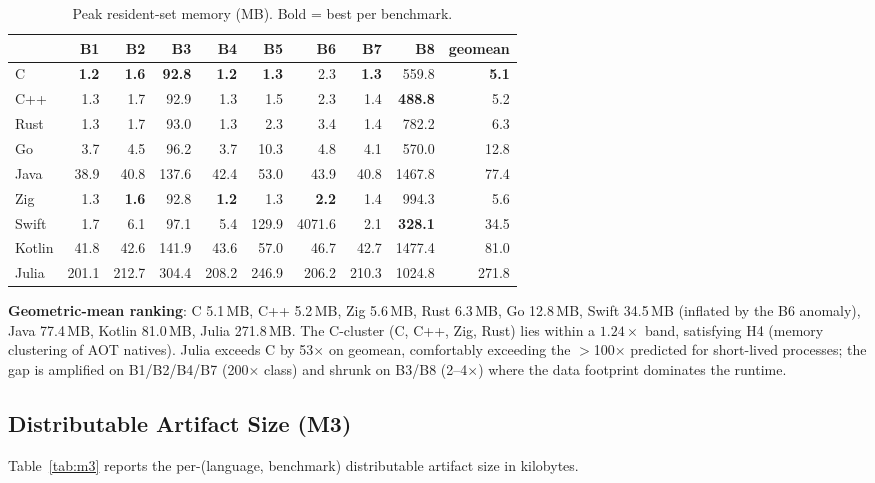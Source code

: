 \documentclass[10pt,conference]{IEEEtran}
\begin{document}
\begin{table}[t]
\caption{Peak resident-set memory (MB). Bold = best per benchmark.}
\label{tab:m2}
\centering
\small
\begin{tabular}{l*{8}{r}r}
\toprule
            & \textbf{B1} & \textbf{B2} & \textbf{B3} & \textbf{B4} & \textbf{B5} & \textbf{B6} & \textbf{B7} & \textbf{B8} & \textbf{geomean} \\
\midrule
C       & \textbf{1.2} & \textbf{1.6} & \textbf{92.8} & \textbf{1.2} & \textbf{1.3} & 2.3 & \textbf{1.3} & 559.8 & \textbf{5.1} \\
C++     & 1.3 & 1.7 & 92.9 & 1.3 & 1.5 & 2.3 & 1.4 & \textbf{488.8} & 5.2 \\
Rust    & 1.3 & 1.7 & 93.0 & 1.3 & 2.3 & 3.4 & 1.4 & 782.2 & 6.3 \\
Go      & 3.7 & 4.5 & 96.2 & 3.7 & 10.3 & 4.8 & 4.1 & 570.0 & 12.8 \\
Java    & 38.9 & 40.8 & 137.6 & 42.4 & 53.0 & 43.9 & 40.8 & 1467.8 & 77.4 \\
Zig     & 1.3 & \textbf{1.6} & 92.8 & \textbf{1.2} & 1.3 & \textbf{2.2} & 1.4 & 994.3 & 5.6 \\
Swift   & 1.7 & 6.1 & 97.1 & 5.4 & 129.9 & 4071.6 & 2.1 & \textbf{328.1} & 34.5 \\
Kotlin  & 41.8 & 42.6 & 141.9 & 43.6 & 57.0 & 46.7 & 42.7 & 1477.4 & 81.0 \\
Julia   & 201.1 & 212.7 & 304.4 & 208.2 & 246.9 & 206.2 & 210.3 & 1024.8 & 271.8 \\
\bottomrule
\end{tabular}
\end{table}

\textbf{Geometric-mean ranking}: C 5.1\,MB, C++ 5.2\,MB, Zig
5.6\,MB, Rust 6.3\,MB, Go 12.8\,MB, Swift 34.5\,MB (inflated by
the B6 anomaly), Java 77.4\,MB, Kotlin 81.0\,MB, Julia 271.8\,MB.
The C-cluster (C, C++, Zig, Rust) lies within a $1.24\times$
band, satisfying H4 (memory clustering of AOT natives). Julia
exceeds C by 53$\times$ on geomean, comfortably exceeding the
$>$100$\times$ predicted for short-lived processes; the gap is
amplified on B1/B2/B4/B7 (200$\times$ class) and shrunk on B3/B8
(2--4$\times$) where the data footprint dominates the runtime.

\subsection{Distributable Artifact Size (M3)}
\label{sec:res-binary}

Table~\ref{tab:m3} reports the per-(language, benchmark)
distributable artifact size in kilobytes.
\end{document}
